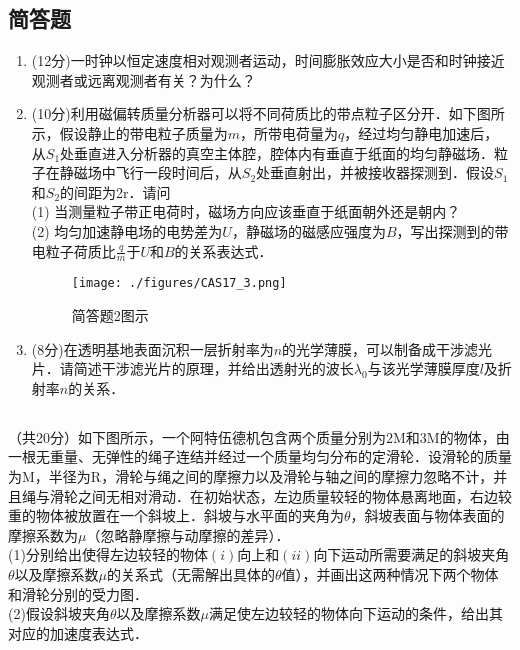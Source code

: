 \subsection{简答题}
\begin{enumerate}
\item (12分)一时钟以恒定速度相对观测者运动，时间膨胀效应大小是否和时钟接近观测者或远离观测者有关？为什么？
\item (10分)利用磁偏转质量分析器可以将不同荷质比的带点粒子区分开．如下图所示，假设静止的带电粒子质量为$m$，所带电荷量为$q$，经过均匀静电加速后，从$S_{1}$处垂直进入分析器的真空主体腔，腔体内有垂直于纸面的均匀静磁场．粒子在静磁场中飞行一段时间后，从$S_{2}$处垂直射出，并被接收器探测到．假设$S_{1}$和$S_{2}$的间距为2r．请问\\
(1) 当测量粒子带正电荷时，磁场方向应该垂直于纸面朝外还是朝内？\\
(2) 均匀加速静电场的电势差为$U$，静磁场的磁感应强度为$B$，写出探测到的带电粒子荷质比$\frac{q}{m}$于$U$和$B$的关系表达式．\\
\begin{figure}[ht]
\centering
\texttt{[image: ./figures/CAS17\_3.png]}
\caption{简答题2图示} \label{CAS17_fig3}
\end{figure}
\item (8分)在透明基地表面沉积一层折射率为$n$的光学薄膜，可以制备成干涉滤光片．请简述干涉滤光片的原理，并给出透射光的波长$\lambda_{0}$与该光学薄膜厚度$l$及折射率$n$的关系．
\end{enumerate}
\subsection{ }
（共20分）如下图所示，一个阿特伍德机包含两个质量分别为$2\mathrm{M}$和$3\mathrm{M}$的物体，由一根无重量、无弹性的绳子连结并经过一个质量均匀分布的定滑轮．设滑轮的质量为$\mathrm{M}$，半径为$\mathrm{R}$，滑轮与绳之间的摩擦力以及滑轮与轴之间的摩擦力忽略不计，并且绳与滑轮之间无相对滑动．在初始状态，左边质量较轻的物体悬离地面，右边较重的物体被放置在一个斜坡上．斜坡与水平面的夹角为$\theta$，斜坡表面与物体表面的摩擦系数为$\mu$（忽略静摩擦与动摩擦的差异）．\\
(1)分别给出使得左边较轻的物体$(i)$向上和$(ii)$向下运动所需要满足的斜坡夹角$\theta$以及摩擦系数$\mu$的关系式（无需解出具体的$\theta$值），并画出这两种情况下两个物体和滑轮分别的受力图．\\
(2)假设斜坡夹角$\theta$以及摩擦系数$\mu$满足使左边较轻的物体向下运动的条件，给出其对应的加速度表达式．\\
